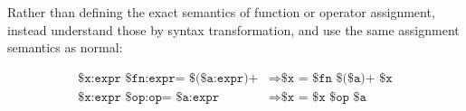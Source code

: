 \begin{prooftree}
\end{prooftree}

Rather than defining the exact semantics of function or operator assignment,
instead understand those by syntax transformation, and use the same assignment
semantics as normal:

\begin{align*}
    \texttt{\$x:expr \$fn:expr= \$(\$a:expr)+} &\Rightarrow \texttt{\$x = \$fn \$(\$a)+ \$x} \\ %
    \texttt{\$x:expr \$op:op= \$a:expr} & \Rightarrow \texttt{\$x = \$x \$op \$a} \\ %
\end{align*}
